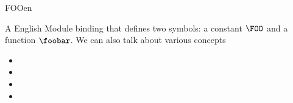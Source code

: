 \begin{mhmodnl}{FOO}{en}
  \begin{definition}
    A English Module binding that defines two symbols: a constant $\FOO$ and a function
    $\foobar$. We can also talk about various concepts
    \begin{itemize}
    \item   {}
    \item   {}
    \item   {}
    \item   {}
    \end{itemize}
  \end{definition}
\end{mhmodnl}

